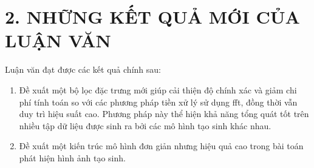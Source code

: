 \section*{2. NHỮNG KẾT QUẢ MỚI CỦA LUẬN VĂN}
Luận văn đạt được các kết quả chính sau:

\begin{enumerate}
	\item Đề xuất một bộ lọc đặc trưng mới giúp cải thiện độ chính xác và giảm chi phí tính toán so với các phương pháp tiền xử lý sử dụng \gls{fft}, đồng thời vẫn duy trì hiệu suất cao. Phương pháp này thể hiện khả năng tổng quát tốt trên nhiều tập dữ liệu được sinh ra bởi các mô hình tạo sinh khác nhau.


	\item Đề xuất một kiến trúc mô hình đơn giản nhưng hiệu quả cao trong bài toán phát hiện hình ảnh tạo sinh.
\end{enumerate}














